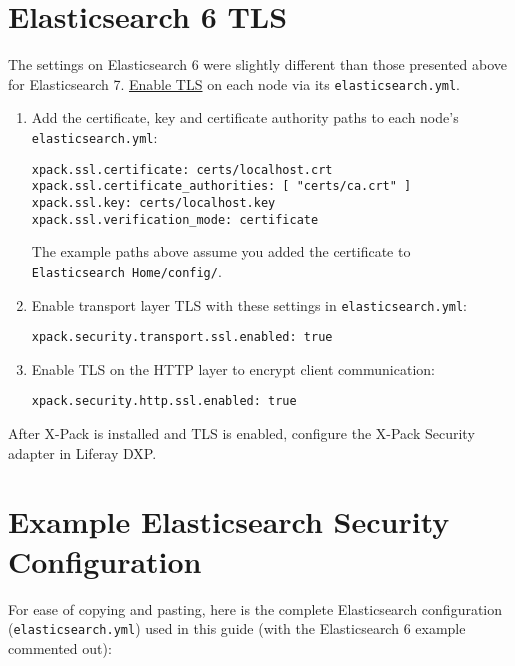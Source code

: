 \section{Elasticsearch 6 TLS}\label{elasticsearch-6-tls}

The settings on Elasticsearch 6 were slightly different than those
presented above for Elasticsearch 7.
\href{https://www.elastic.co/guide/en/elasticsearch/reference/7.x/configuring-tls.html\#enable-ssl}{Enable
TLS} on each node via its \texttt{elasticsearch.yml}.

\begin{enumerate}
\def\labelenumi{\arabic{enumi}.}
\item
  Add the certificate, key and certificate authority paths to each
  node's \texttt{elasticsearch.yml}:

\begin{verbatim}
xpack.ssl.certificate: certs/localhost.crt
xpack.ssl.certificate_authorities: [ "certs/ca.crt" ]
xpack.ssl.key: certs/localhost.key
xpack.ssl.verification_mode: certificate 
\end{verbatim}

  The example paths above assume you added the certificate to
  \texttt{Elasticsearch\ Home/config/}.
\item
  Enable transport layer TLS with these settings in
  \texttt{elasticsearch.yml}:

\begin{verbatim}
xpack.security.transport.ssl.enabled: true
\end{verbatim}
\item
  Enable TLS on the HTTP layer to encrypt client communication:

\begin{verbatim}
xpack.security.http.ssl.enabled: true
\end{verbatim}
\end{enumerate}

After X-Pack is installed and TLS is enabled, configure the X-Pack
Security adapter in Liferay DXP.

\section{Example Elasticsearch Security
Configuration}\label{example-elasticsearch-security-configuration}

For ease of copying and pasting, here is the complete Elasticsearch
configuration (\texttt{elasticsearch.yml}) used in this guide (with the
Elasticsearch 6 example commented out):

